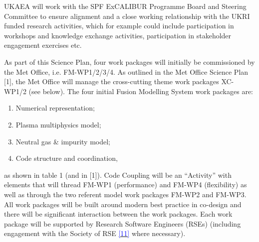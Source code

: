 \documentclass[a4paper]{article}
\newcommand\textstyleInternetlink[1]{\textcolor{blue}{#1}}
\newcommand\liststyleWWNumvi{%
\renewcommand\theenumi{\arabic{enumi}}
\renewcommand\theenumii{\alph{enumii}}
\renewcommand\theenumiii{\roman{enumiii}}
\renewcommand\theenumiv{\arabic{enumiv}}
\renewcommand\labelenumi{\theenumi.}
\renewcommand\labelenumii{\theenumii.}
\renewcommand\labelenumiii{\theenumiii.}
\renewcommand\labelenumiv{\theenumiv.}
}
\begin{document}
\bigskip

UKAEA will work with the SPF ExCALIBUR Programme Board and Steering Committee 
to ensure alignment and a close working
relationship with the UKRI funded research activities, which for example could 
include participation in workshops and
knowledge exchange activities, participation in stakeholder engagement 
exercises etc.


\bigskip

As part of this Science Plan, four work packages will initially be commissioned 
by the Met Office, i.e. FM-WP1/2/3/4. As
outlined in the Met Office Science Plan [1], the Met Office will manage the 
cross-cutting theme work packages XC-WP1/2
(see below). The four initial Fusion Modelling System work packages are:


\bigskip

\liststyleWWNumvi
\begin{enumerate}
\item Numerical representation;
\item Plasma multiphysics model;
\item Neutral gas \& impurity model;
\item Code structure and coordination,
\end{enumerate}

\bigskip

as shown in table 1 (and in [1]). Code Coupling will be an ``Activity'' with 
elements that will thread FM-WP1
(performance) and FM-WP4 (flexibility) as well as through the two referent 
model work packages FM-WP2 and FM-WP3. All
work packages will be built around modern best practice in co-design and there 
will be significant interaction between
the work packages. Each work package will {be supported by Research Software 
Engineers (RSEs)
(including engagement with the Society of RSE
}\href{https://society-rse.org/}{\textstyleInternetlink{{[11]}}} where 
necessary).


\bigskip


\bigskip
\end{document}
